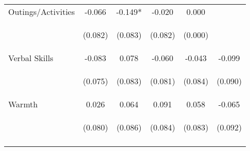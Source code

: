 \begin{tabular}{lccccc}
\noalign{\smallskip}Outings/Activities & -0.066 & -0.149* & -0.020 & 0.000 & \\
 & \begin{footnotesize}(0.082)\end{footnotesize} & \begin{footnotesize}(0.083)\end{footnotesize} & \begin{footnotesize}(0.082)\end{footnotesize} & \begin{footnotesize}(0.000)\end{footnotesize} & \begin{footnotesize}\end{footnotesize}\\
\noalign{\smallskip}Verbal Skills & -0.083 & 0.078 & -0.060 & -0.043 & -0.099\\
 & \begin{footnotesize}(0.075)\end{footnotesize} & \begin{footnotesize}(0.083)\end{footnotesize} & \begin{footnotesize}(0.081)\end{footnotesize} & \begin{footnotesize}(0.084)\end{footnotesize} & \begin{footnotesize}(0.090)\end{footnotesize}\\
\noalign{\smallskip}Warmth & 0.026 & 0.064 & 0.091 & 0.058 & -0.065\\
 & \begin{footnotesize}(0.080)\end{footnotesize} & \begin{footnotesize}(0.086)\end{footnotesize} & \begin{footnotesize}(0.084)\end{footnotesize} & \begin{footnotesize}(0.083)\end{footnotesize} & \begin{footnotesize}(0.092)\end{footnotesize}\\
\noalign{\smallskip}\hline\end{tabular}\\
